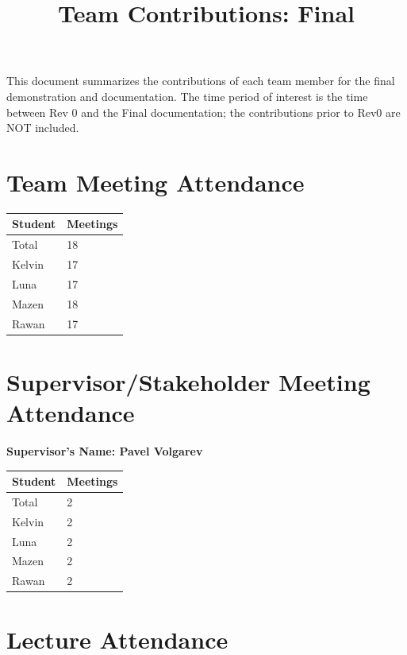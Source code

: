 \documentclass{article}
\title{Team Contributions: Final\\\progname}
\author{\authname}
\date{}
\begin{document}
\maketitle

This document summarizes the contributions of each team member for the final
demonstration and documentation.  The time period of interest is the time
between Rev 0 and the Final documentation; the contributions prior to Rev0 are
NOT included.

\section{Team Meeting Attendance}


\begin{table}[H]
\centering
\begin{tabular}{ll}
\toprule
\textbf{Student} & \textbf{Meetings}\\
\midrule
Total & 18\\
Kelvin & 17\\
Luna & 17\\
Mazen & 18\\
Rawan & 17\\
\bottomrule
\end{tabular}
\end{table}


\section{Supervisor/Stakeholder Meeting Attendance}

\noindent \textbf{Supervisor's Name: Pavel Volgarev }

\begin{table}[H]
\centering
\begin{tabular}{ll}
\toprule
\textbf{Student} & \textbf{Meetings}\\
\midrule
Total & 2\\
Kelvin & 2\\
Luna & 2\\
Mazen & 2\\
Rawan & 2\\
\bottomrule
\end{tabular}
\end{table}

\section{Lecture Attendance}
\end{document}
